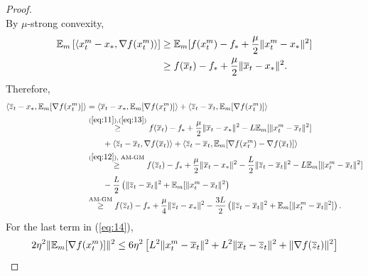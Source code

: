 \documentclass{article} %
\numberwithin{equation}{section}
\renewcommand{\eqref}[1]{(\ref{#1})}
\begin{document}
\begin{proof}
\begin{equation}
    \end{equation}
    By $\mu$-strong convexity,
    \begin{equation}\label{eq:13}
        \begin{aligned}
            \mathbb{E}_m \left[\left\langle x_t^m-x_*, \nabla f(x_t^m)\right\rangle\right]
            &\geq \mathbb{E}_m[f(x_t^m)-f_*+\frac{\mu}{2}\|x_t^m-x_*\|^2] \\
            &\geq f(\overline{x}_t)-f_*+\frac{\mu}{2}\|\overline{x}_t-x_*\|^2.
        \end{aligned}
    \end{equation}
    Therefore,
    \begin{equation}
        \begin{aligned}
            \left\langle\overline{z}_t-x_*, \expect_m [\nabla f(x_t^m)]\right\rangle 
            &= \left\langle\overline{x}_t-x_*, \expect_m [\nabla f(x_t^m)]\right\rangle + \left\langle\overline{z}_t-\overline{x}_t, \expect_m [\nabla f(x_t^m)]\right\rangle \\
            &\overset{\eqref{eq:11}, \eqref{eq:13}}{\geq} f(\overline{x}_t)-f_*+\frac{\mu}{2}\|\overline{x}_t-x_*\|^2 -L\expect_m [\|x_t^m-\overline{x}_t\|^2]\\
            &\qquad + \left\langle\overline{z}_t-\overline{x}_t, \nabla f(\overline{x}_t)\right\rangle + \left\langle\overline{z}_t-\overline{x}_t, \expect_m [\nabla f(x_t^m)-\nabla f(\overline{x}_t)]\right\rangle \\
            &\overset{\eqref{eq:12}\text{, AM-GM}}{\geq} f(\overline{z}_t)-f_*+\frac{\mu}{2}\|\overline{x}_t-x_*\|^2-\frac{L}{2}\|\overline{z}_t-\overline{x}_t\|^2-L\expect_m [\|x_t^m-\overline{x}_t\|^2] \\
            &\qquad -\frac{L}{2}\left(\|\overline{z}_t-\overline{x}_t\|^2+\expect_m [\|x_t^m-\overline{x}_t\|^2\right) \\
            &\overset{\text{AM-GM}}{\geq} f(\overline{z}_t)-f_*+\frac{\mu}{4}\|\overline{z}_t-x_*\|^2-\frac{3L}{2}\left(\|\overline{z}_t-\overline{x}_t\|^2+\expect_m [\|x_t^m-\overline{x}_t\|^2]\right).
        \end{aligned}
    \end{equation}
    For the last term in \eqref{eq:14},
    \begin{equation}
        \begin{aligned}
            2\eta^2\|\expect_m [\nabla f(x_t^m)]\|^2
            &\leq 6\eta^2\left[L^2\|x_t^m-\overline{x}_t\|^2+L^2\|\overline{x}_t-\overline{z}_t\|^2+\|\nabla f(\overline{z}_t)\|^2\right] \\

\end{aligned}
\end{equation}
\end{proof}
\end{document}
